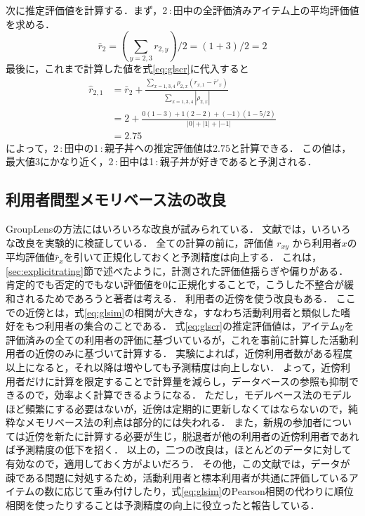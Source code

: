 次に推定評価値を計算する．まず，2\,:\,田中の全評価済みアイテム上の平均評価値を求める．
\[
\bar{r}_2=(\sum_{y=2,3}r_{2,y})/2=(1+3)/2=2 
\]
最後に，これまで計算した値を式\eqref{eq:glscr}に代入すると
{\small\begin{align*}
\hat{r}_{2,1}&=\bar{r}_2+
\frac{\sum_{x=1,3,4}\rho_{2,x}(r_{x,1}-{\bar{r}'}_x)}%
{\sum_{x=1,3,4}|\rho_{2,x}|} \\
&=2+\frac{0(1-3)+1(2-2)+(-1)(1-5/2)}{|0|+|1|+|-1|}\\
&=2.75
\end{align*}}
によって，2\,:\,田中の1\,:\,親子丼への推定評価値は$2.75$と計算できる．
この値は，最大値3にかなり近く，2\,:\,田中は1\,:\,親子丼が好きであると予測される．


\subsection{利用者間型メモリベース法の改良}

GroupLensの方法にはいろいろな改良が試みられている．
文献\cite{sigir:99:02}では，いろいろな改良を実験的に検証している．
全ての計算の前に，評価値 $r_{xy}$ から利用者$x$の平均評価値$\bar{r}_x$を引いて正規化しておくと予測精度は向上する．
これは，\ref{sec:explicitrating}節で述べたように，計測された評価値揺らぎや偏りがある．
肯定的でも否定的でもない評価値を$0$に正規化することで，こうした不整合が緩和されるためであろうと著者は考える．
利用者の近傍を使う改良もある．
ここでの近傍とは，式\eqref{eq:glsim}の相関が大きな，すなわち活動利用者と類似した嗜好をもつ利用者の集合のことである．
式\eqref{eq:glscr}の推定評価値は，アイテム$y$を評価済みの全ての利用者の評価に基づいているが，これを事前に計算した活動利用者の近傍のみに基づいて計算する．
実験によれば，近傍利用者数がある程度以上になると，それ以降は増やしても予測精度は向上しない．
よって，近傍利用者だけに計算を限定することで計算量を減らし，データベースの参照も抑制できるので，効率よく計算できるようになる．
ただし，モデルベース法のモデルほど頻繁にする必要はないが，近傍は定期的に更新しなくてはならないので，純粋なメモリベース法の利点は部分的には失われる．
また，新規の参加者については近傍を新たに計算する必要が生じ，脱退者が他の利用者の近傍利用者であれば予測精度の低下を招く．
以上の，二つの改良は，ほとんどのデータに対して有効なので，適用しておく方がよいだろう．
その他，この文献\cite{sigir:99:02}では，データが疎である問題に対処するため，活動利用者と標本利用者が共通に評価しているアイテムの数に応じて重み付けしたり，式\eqref{eq:glsim}のPearson相関の代わりに順位相関を使ったりすることは予測精度の向上に役立ったと報告している．


